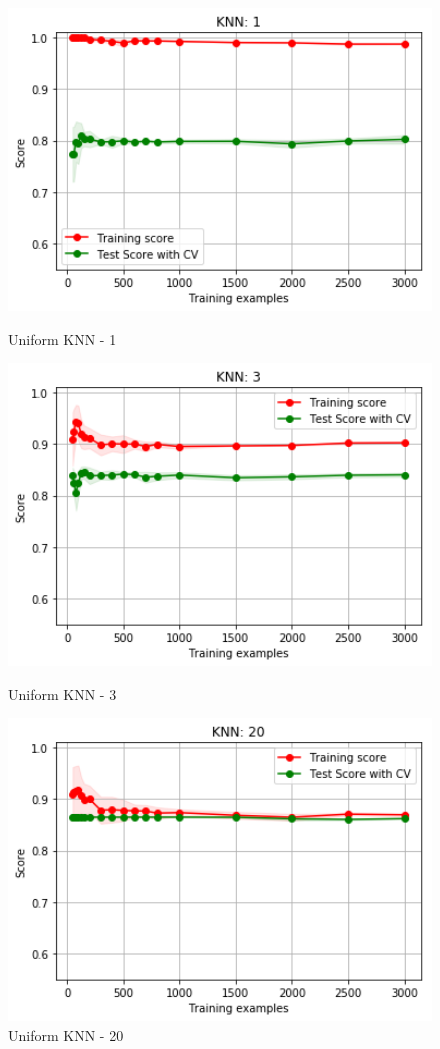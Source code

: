 \documentclass[h]{article}
\begin{document}
\begin{figure}[H]
      \includegraphics[width=1\textwidth,keepaspectratio]{1_knn_1_1.png} 
      \caption*{Uniform KNN - 1} 
   \endminipage\hfill
      \includegraphics[width=1\textwidth,keepaspectratio]{1_knn_3_1.png} 
      \caption*{Uniform KNN - 3} 
   \endminipage\hfill
      \includegraphics[width=1\textwidth,keepaspectratio]{1_knn_20_1.png} 
      \caption*{Uniform KNN - 20} 
   \endminipage\hfill
\end{figure}
\end{document}
